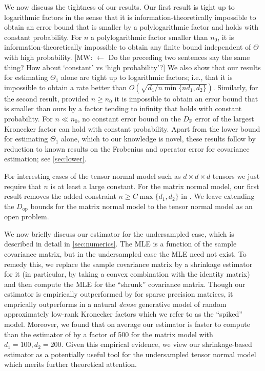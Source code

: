\documentclass[aos]{imsart}
\theoremstyle{definition}
\numberwithin{equation}{section}
\newcommand{\DF}{D_{\operatorname{F}}}
\newcommand{\Dop}{D_{\operatorname{op}}}
\newcommand{\MW}[1]{{\color{red}[MW: #1]}}
\newcommand{\MW}[1]{{}}
\begin{document}
We now discuss the tightness of our results.
Our first result is tight up to logarithmic factors in the sense that it is information-theoretically impossible to obtain an error bound that is smaller by a polylogarithmic factor and holds with constant probability.
For $n$ a polylogarithmic factor smaller than $n_0$, it is information-theoretically impossible to obtain any finite bound independent of $\Theta$ with high probability.
\MW{$\leftarrow$ Do the preceding two sentences say the same thing? How about `constant' vs `high probability'?}
We also show that our results for estimating $\Theta_1$ alone are tight up to logarithmic factors; i.e., that it is impossible to obtain a rate better than $O(\sqrt{d_1/ n \min\{n d_1, d_2\}})$. Similarly, for the second result, provided $n \geq n_0$ it is impossible to obtain an error bound that is smaller than ours by a factor tending to infinity that holds with constant probability. For $n \ll n_0$, no constant error bound on the $\DF$ error of the largest Kronecker factor can hold with constant probability. Apart from the lower bound for estimating $\Theta_1$ alone, which to our knowledge is novel, these results follow by reduction to known results on the Frobenius and operator error for covariance estimation; see \cref{sec:lower}.

For interesting cases of the tensor normal model such as $d\times d \times d$ tensors we just require that $n$ is at least a large constant.
For the matrix normal model, our first result removes the added constraint $n \geq C \max\{d_1,d_2\}$ in \cite{tsiligkaridis2013convergence}.
We leave extending the $\Dop$ bounds for the matrix normal model to the tensor normal model as an open problem.

We now briefly discuss our estimator for the undersampled case, which is described in detail in \cref{sec:numerics}. The MLE is a function of the sample covariance matrix, but in the undersampled case the MLE need not exist. To remedy this, we replace the sample covariance matrix by a shrinkage estimator for it (in particular, by taking a convex combination with the identity matrix) and then compute the MLE for the ``shrunk'' covariance matrix. Though our estimator is empirically outperformed by \cite{zhou2014gemini} for sparse precision matrices, it emprically outperforms \cite{zhou2014gemini} in a natural \emph{dense} generative model of random approximately low-rank Kronecker factors which we refer to as the ``spiked'' model. Moreover, we found that on average our estimator is faster to compute than the estimator of \cite{zhou2014gemini} by a factor of 500 for the matrix model with $d_1 = 100, d_2 = 200$. Given this empirical evidence, we view our shrinkage-based estimator as a potentially useful tool for the undersampled tensor normal model which merits further theoretical attention.
\end{document}
